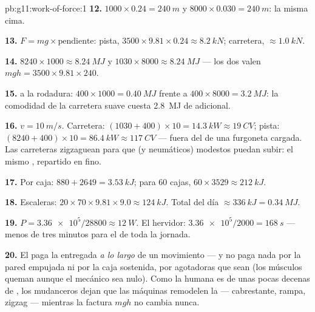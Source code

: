\begin{solution}{pb:g11:work-of-force:1}
\textbf{12.} $1000 \times 0.24 = \qty{240}{m}$ y
$8000 \times 0.030 = \qty{240}{m}$: la misma cima.

\textbf{13.} $F = mg \times \text{pendiente}$: pista,
$3500 \times 9.81 \times 0.24 \approx \qty{8.2}{kN}$; carretera,
$\approx \qty{1.0}{kN}$.

\textbf{14.} $8240 \times 1000 \approx \qty{8.24}{MJ}$ y
$1030 \times 8000 \approx \qty{8.24}{MJ}$ --- los dos valen
$mgh = 3500 \times 9.81 \times 240$.

\textbf{15.}  a la rodadura:
$400 \times 1000 = \qty{0.40}{MJ}$ frente a
$400 \times 8000 = \qty{3.2}{MJ}$: la comodidad de la carretera suave
cuesta \qty{2.8}{MJ} de  adicional.

\textbf{16.} $v = \qty{10}{m/s}$. Carretera:
$(1030 + 400) \times 10 = \qty{14.3}{kW} \approx \qty{19}{CV}$; pista:
$(8240 + 400) \times 10 = \qty{86.4}{kW} \approx \qty{117}{CV}$ ---
fuera del  de una furgoneta cargada. Las carreteras zigzaguean
para que  (y neumáticos) modestos puedan subir: el mismo ,
repartido en fino.

\textbf{17.} Por caja: $880 + 2649 = \qty{3.53}{kJ}$; para $60$ cajas,
$60 \times 3529 \approx \qty{212}{kJ}$.

\textbf{18.} Escaleras:
$20 \times 70 \times 9.81 \times 9.0 \approx \qty{124}{kJ}$. Total del
día $\approx \qty{336}{kJ} = \qty{0.34}{MJ}$.

\textbf{19.} $P = \num{3.36e5}/28800 \approx \qty{12}{W}$. El hervidor:
$\num{3.36e5}/2000 = \qty{168}{s}$ --- menos de tres minutos para el
 de toda la jornada.

\textbf{20.} El  paga la  entregada \emph{a lo largo} de un
movimiento --- y no paga nada por la pared empujada ni por la caja
sostenida, por agotadoras que sean (los músculos queman 
aunque el  mecánico sea nulo). Como la  humana es de unas
pocas decenas de , los mudanceros dejan que las máquinas
remodelen la  --- cabrestante, rampa, zigzag --- mientras la
factura $mgh$ no cambia nunca.
\end{solution}
